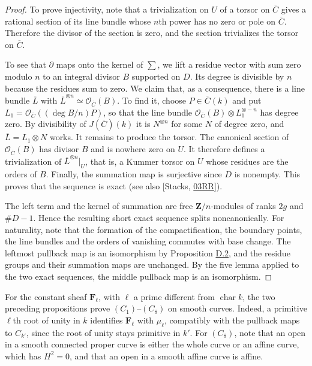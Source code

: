 \documentclass[11pt]{article}
\begin{document}
\begin{proof}[{Proof}]
To prove injectivity, note that a trivialization on \(U\) of a torsor on \(\overline C\) gives a rational section of its line bundle whose \(n\)th power has no zero or pole on \(\overline C\).  Therefore the divisor of the section is zero, and the section trivializes the torsor on \(\overline C\).

To see that \(\partial\) maps onto the kernel of \(\sum\), we lift a residue vector with sum zero modulo \(n\) to an integral divisor \(B\) supported on \(D\). Its degree is divisible by \(n\) because the residues sum to zero. We claim that, as a consequence, there is a line bundle \(\overline L\) with \(\overline L^{\otimes n}\simeq\mathcal O_{\overline C}(B)\). To find it, choose \(P\in\overline C(k)\) and put \(L_1=\mathcal O_{\overline C}((\deg B/n)P)\), so that the line bundle \(\mathcal O_{\overline C}(B)\otimes L_1^{\otimes-n}\) has degree zero. By divisibility of \(J(\overline C)(k)\) it is \(N^{\otimes n}\) for some \(N\) of degree zero, and \(\overline L=L_1\otimes N\) works. It remains to produce the torsor. The canonical section of \(\mathcal O_{\overline C}(B)\) has divisor \(B\) and is nowhere zero on \(U\). It therefore defines a trivialization of \(\overline L^{\otimes n}|_U\), that is, a Kummer torsor on \(U\) whose residues are the orders of \(B\). Finally, the summation map is surjective since \(D\) is nonempty. This proves that the sequence is exact (see also [Stacks, \href{https://stacks.math.columbia.edu/tag/03RR}{03RR}]).

The left term and the kernel of summation are free \(\mathbf Z/n\)-modules of ranks \(2g\) and \(\#D-1\). Hence the resulting short exact sequence splits noncanonically. For naturality, note that the formation of the compactification, the boundary points, the line bundles and the orders of vanishing commutes with base change. The leftmost pullback map is an isomorphism by Proposition \hyperref[bp8]{D.2}, and the residue groups and their summation maps are unchanged. By the five lemma applied to the two exact sequences, the middle pullback map is an isomorphism.
\end{proof}

\label{bp15}%
For the constant sheaf \(\mathbf F_\ell\), with \(\ell\) a prime different from \(\operatorname{char}k\), the two preceding propositions prove \((C_1)\)–\((C_8)\) on smooth curves. Indeed, a primitive \(\ell\)th root of unity in \(k\) identifies \(\mathbf F_\ell\) with \(\mu_\ell\), compatibly with the pullback maps to \(C_{k'}\), since the root of unity stays primitive in \(k'\). For \((C_8)\), note that an open in a smooth connected proper curve is either the whole curve or an affine curve, which has \(H^2=0\), and that an open in a smooth affine curve is affine.
\end{document}
